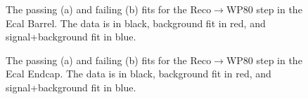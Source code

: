 \begin{thebibliography}{10}
\begin{figure}[htb]
  \begin{center}
    \caption{The passing (a) and failing (b) fits for the Reco$\to$WP80 step in the Ecal Barrel.
             The data is in black, background fit in red, and signal+background fit in blue.}
  \end{center}
\end{figure}

\begin{figure}[htb]
  \begin{center}
    \caption{The passing (a) and failing (b) fits for the Reco$\to$WP80 step in the Ecal Endcap.  
             The data is in black, background fit in red, and signal+background fit in blue.}
  \end{center}
\end{figure}


\end{thebibliography}
